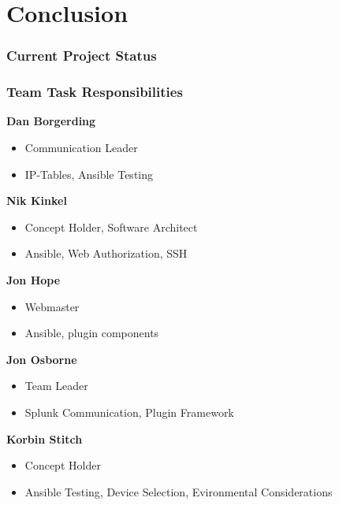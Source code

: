 \section{Conclusion}

\begin{frame}
\frametitle{Current Project Status}


\end{frame}

\begin{frame}
\frametitle{Team Task Responsibilities}

\textbf{Dan Borgerding}
\begin{itemize}
\item Communication Leader
\item IP-Tables, Ansible Testing\end{itemize}

\textbf{Nik Kinkel}
\begin{itemize}
\item Concept Holder, Software Architect
\item Ansible, Web Authorization, SSH \end{itemize}


\textbf{Jon Hope}
\begin{itemize}
\item Webmaster
\item Ansible, plugin components
\end{itemize}

\textbf{Jon Osborne}
\begin{itemize}
\item Team Leader
\item Splunk Communication, Plugin Framework
\end{itemize}

\textbf{Korbin Stitch}
\begin{itemize}
\item Concept Holder
\item  Ansible Testing, Device Selection, Evironmental Considerations
\end{itemize}



\end{frame}


